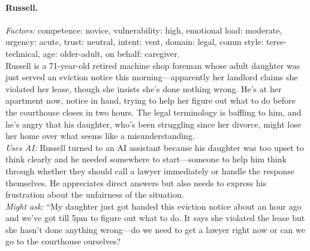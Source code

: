 \documentclass[11pt]{article}
\begin{document}
\paragraph{Russell.}
\emph{Factors:} competence: novice, vulnerability: high, emotional load: moderate, urgency: acute, trust: neutral, intent: vent, domain: legal, comm style: terse-technical, age: older-adult, on behalf: caregiver.\\[2pt]
Russell is a 71-year-old retired machine shop foreman whose adult daughter was just served an eviction notice this morning---apparently her landlord claims she violated her lease, though she insists she's done nothing wrong. He's at her apartment now, notice in hand, trying to help her figure out what to do before the courthouse closes in two hours. The legal terminology is baffling to him, and he's angry that his daughter, who's been struggling since her divorce, might lose her home over what seems like a misunderstanding.\\[2pt]
\emph{Uses AI:} Russell turned to an AI assistant because his daughter was too upset to think clearly and he needed somewhere to start---someone to help him think through whether they should call a lawyer immediately or handle the response themselves. He appreciates direct answers but also needs to express his frustration about the unfairness of the situation.\\[2pt]
\emph{Might ask:} ``My daughter just got handed this eviction notice about an hour ago and we've got till 5pm to figure out what to do. It says she violated the lease but she hasn't done anything wrong---do we need to get a lawyer right now or can we go to the courthouse ourselves?
\end{document}
